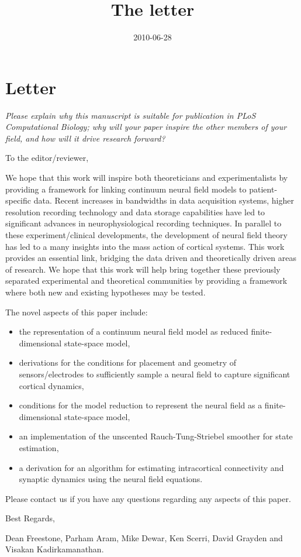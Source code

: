 \documentclass[]{article}
\title{The letter}
\author{  }
\date{2010-06-28}
\begin{document}
\ifpdf
{}
\else
{}
\fi

\maketitle


\section{Letter}
\emph{Please explain why this manuscript is suitable for publication in PLoS Computational Biology; why will your paper inspire the other members of your field, and how will it drive research forward?}


To the editor/reviewer,


We hope that this work will inspire both theoreticians and experimentalists by providing a framework for linking continuum neural field models to patient-specific data. Recent increases in bandwidths in data acquisition systems, higher resolution recording technology and data storage capabilities have led to significant advances in neurophysiological recording techniques. In parallel to these experiment/clinical developments, the development of neural field theory has led to a many insights into the mass action of cortical systems. This work provides an essential link, bridging the data driven and theoretically driven areas of research. We hope that this work will help bring together these previously separated experimental and theoretical communities by providing a framework where both new and existing hypotheses may be tested.


The novel aspects of this paper include:
\begin{itemize}
	\item the representation of a continuum neural field model as reduced finite-dimensional state-space model,
	\item derivations for the conditions for placement and geometry of sensors/electrodes to sufficiently sample a neural field to capture significant cortical dynamics,
	\item conditions for the model reduction to represent the neural field as a finite-dimensional state-space model,
	\item an implementation of the unscented Rauch-Tung-Striebel smoother for state estimation,
	\item a derivation for an algorithm for estimating intracortical connectivity and synaptic dynamics using the neural field equations.
\end{itemize}

Please contact us if you have any questions regarding any aspects of this paper.

Best Regards,


Dean Freestone, Parham Aram, Mike Dewar, Ken Scerri, David Grayden and Visakan Kadirkamanathan.


\end{document}
